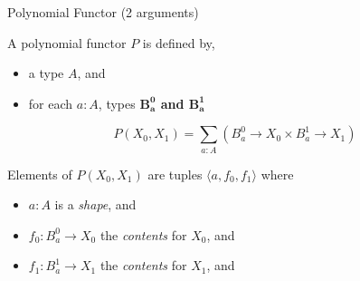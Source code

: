 \documentclass[t,12pt]{beamer}
\begin{document}

\begin{frame}{Polynomial Functor (2 arguments)}

    \vfill

    A polynomial functor $P$ is defined by,
    \begin{itemize}
        \item a type $A$, and
        \item for each $a : A$, types \textbf{$\mathbf{B^0_{a}}$ and $\mathbf{B^1_a}$}
    \end{itemize}

    \vfill

    \[
        P(X_0, X_1) = \sum_{a : A} \left( B^0_a → X_0  ×  B^1_a → X_1 \right)
    \]

    \vfill

    Elements of $P(X_0, X_1)$ are tuples $⟨a, f_0, f_1⟩$ where
    \begin{itemize}
        \item $a : A$ is a \emph{shape}, and
        \item $f_0 : B^0_a → X_0$ the \emph{contents} for $X_0$, and
        \item $f_1 : B^1_a → X_1$ the \emph{contents} for $X_1$, and
    \end{itemize}


    \vfill
    
\end{frame}

\end{document}
